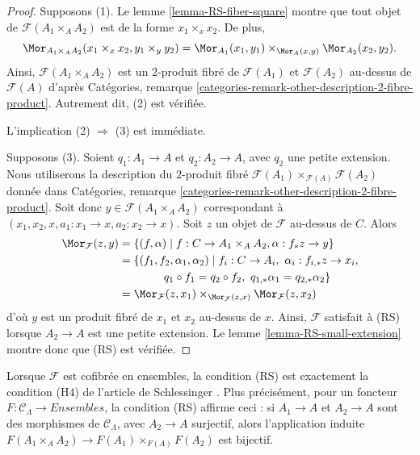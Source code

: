 \begin{proof}
Supposons (1). Le lemme \ref{lemma-RS-fiber-square} montre que tout objet de
$\mathcal{F}(A_1 \times_A A_2)$ est de la forme $x_1 \times_x x_2$. De plus,
$$
\Mor_{A_1 \times_A A_2}(x_1 \times_x x_2, y_1 \times_y y_2) =
\Mor_{A_1}(x_1, y_1) \times_{\Mor_A(x, y)}
\Mor_{A_2}(x_2, y_2).
$$
Ainsi, $\mathcal{F}(A_1 \times_A A_2)$ est un $2$-produit fibré de
$\mathcal{F}(A_1)$ et $\mathcal{F}(A_2)$ au-dessus de $\mathcal{F}(A)$ d'après
Catégories, remarque \ref{categories-remark-other-description-2-fibre-product}.
Autrement dit, (2) est vérifiée.

\medskip\noindent
L'implication (2) $\Rightarrow$ (3) est immédiate.

\medskip\noindent
Supposons (3). Soient $q_1 : A_1 \to A$ et $q_2 : A_2 \to A$, avec $q_2$
une petite extension. Nous utiliserons la description du $2$-produit fibré
$\mathcal{F}(A_1) \times_{\mathcal{F}(A)} \mathcal{F}(A_2)$ donnée dans
Catégories, remarque \ref{categories-remark-other-description-2-fibre-product}.
Soit donc $y \in \mathcal{F}(A_1 \times_A A_2)$ correspondant à
$(x_1, x_2, x, a_1 : x_1 \to x, a_2 : x_2 \to x)$.
Soit $z$ un objet de $\mathcal{F}$ au-dessus de $C$. Alors
\begin{align*}
\Mor_\mathcal{F}(z, y) & =
\{(f, \alpha) \mid f : C \to A_1 \times_A A_2,
\alpha : f_*z \to y\} \\
& = \{(f_1, f_2, \alpha_1, \alpha_2) \mid
f_i : C \to A_i, \ \alpha_i : f_{i, *}z \to x_i, \\
& \quad\quad\quad\quad
q_1 \circ f_1 = q_2 \circ f_2, \ q_{1, *} \alpha_1 = q_{2, *}\alpha_2\} \\
& =
\Mor_\mathcal{F}(z, x_1) \times_{\Mor_\mathcal{F}(z, x)}
\Mor_\mathcal{F}(z, x_2)
\end{align*}
d'où $y$ est un produit fibré de $x_1$ et $x_2$ au-dessus de $x$. Ainsi,
$\mathcal{F}$ satisfait à (RS) lorsque $A_2 \to A$ est une petite extension.
Le lemme \ref{lemma-RS-small-extension} montre donc que (RS) est vérifiée.
\end{proof}

\begin{remark}
\label{remark-compare-schlessinger-H4}
Lorsque $\mathcal{F}$ est cofibrée en ensembles, la condition (RS) est
exactement la condition (H4) de l'article de Schlessinger
\cite[théorème 2.11]{Sch}. Plus précisément, pour un foncteur
$F: \mathcal{C}_\Lambda \to \textit{Ensembles}$, la condition (RS) affirme ceci :
si $A_1 \to A$ et $A_2 \to A$ sont des morphismes de
$\mathcal{C}_\Lambda$, avec $A_2 \to A$ surjectif, alors l'application induite
$F(A_1 \times_A A_2) \to F(A_1) \times_{F(A)} F(A_2)$ est bijectif.
\end{remark}

